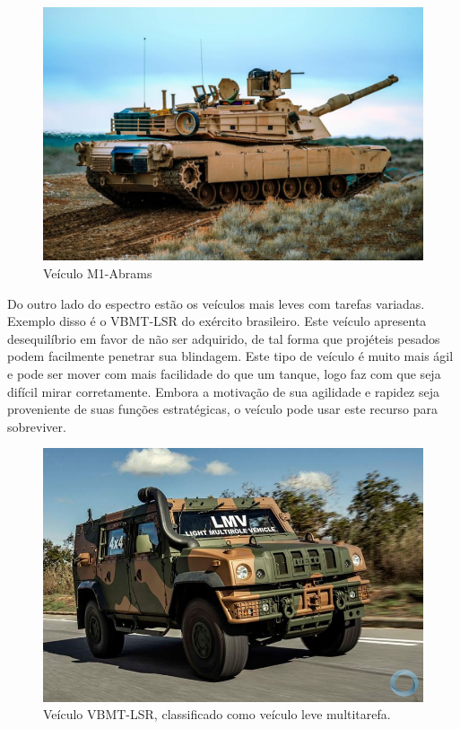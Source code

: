 \begin{figure}[h]
	\caption{\label{fig:0.2} Veículo M1-Abrams}
	\centering
	\includegraphics[width=0.7\linewidth]{images/m1-abrams}
\end{figure}

 Do outro lado do espectro estão os veículos mais leves com tarefas variadas. Exemplo disso é o VBMT-LSR do exército brasileiro. Este veículo apresenta desequilíbrio em favor de não ser adquirido, de tal forma que projéteis pesados podem facilmente penetrar sua blindagem. Este tipo de veículo é muito mais ágil e pode ser mover com mais facilidade do que um tanque, logo faz com que seja difícil mirar corretamente. Embora a motivação de sua agilidade e rapidez seja proveniente de suas funções estratégicas, o veículo pode usar este recurso para sobreviver. \\
 \begin{figure}[h]
 	\caption{\label{fig:0.3} Veículo VBMT-LSR, classificado como veículo leve multitarefa.}
 	\centering
 	\includegraphics[width=0.7\linewidth]{images/lmv}
 \end{figure} 
\vspace{10mm}

